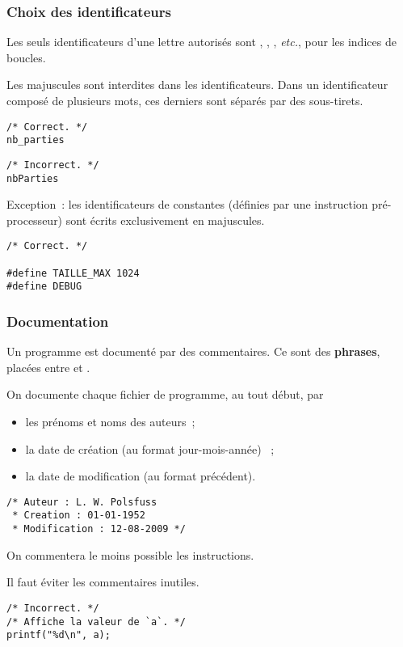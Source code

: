 \begin{frame}[fragile] \frametitle{Choix des identificateurs}
Les seuls identificateurs d'une lettre autorisés sont ,
, , {\em etc.}, pour les indices de boucles.
\medskip

Les majuscules sont interdites dans les identificateurs. Dans un
identificateur composé de plusieurs mots, ces derniers sont séparés par 
des sous-tirets.

\begin{multicols}{2}
\begin{lstlisting}
/* Correct. */
nb_parties
\end{lstlisting}

\begin{lstlisting}
/* Incorrect. */
nbParties
\end{lstlisting}
\end{multicols}

Exception~: les identificateurs de constantes (définies par une 
instruction pré-processeur) sont écrits exclusivement en majuscules.
\begin{lstlisting}
/* Correct. */

#define TAILLE_MAX 1024
#define DEBUG
\end{lstlisting}
\end{frame}

\begin{frame}[fragile] \frametitle{Documentation}
Un programme est documenté par des \alert{commentaires}. Ce sont des 
{\bf phrases}, placées entre \Code{/*} et \Code{*/}.
\medskip

On documente chaque \alert{fichier de programme}, au tout début, par

\begin{itemize}
    \item les prénoms et noms des auteurs~;
    \smallskip
    
    \item la date de création (au format jour-mois-année) ~;
    \smallskip
    
    \item la date de modification (au format précédent).
\end{itemize}

\begin{lstlisting}
/* Auteur : L. W. Polsfuss
 * Creation : 01-01-1952
 * Modification : 12-08-2009 */
\end{lstlisting}
\bigskip

On commentera le moins possible les instructions.
\smallskip

Il faut éviter les commentaires inutiles.
\begin{lstlisting}
/* Incorrect. */
/* Affiche la valeur de `a`. */
printf("%d\n", a); 
\end{lstlisting}
\end{frame}

